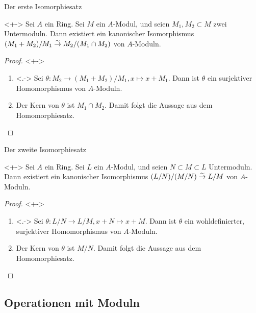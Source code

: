 \begin{frame}{Der erste Isomorphiesatz}
	\begin{proposition}<+->
		Sei \(A\) ein Ring. Sei \(M\) ein \(A\)-Modul, und seien \(M_1, M_2 \subset M\)
		zwei Untermoduln. Dann existiert ein kanonischer Isomorphismus
		\((M_1 + M_2)/M_1 \stackrel\sim\to M_2/(M_1 \cap M_2)\) von \(A\)-Moduln.
	\end{proposition}
	\begin{proof}<+->
		\begin{enumerate}[<+->]
		\item<.->
			Sei \(\theta\colon M_2 \to (M_1 + M_2)/M_1, x \mapsto x + M_1\). Dann ist \(\theta\)
			ein surjektiver Homomorphismus von \(A\)-Moduln.
		\item
			Der Kern von \(\theta\) ist \(M_1 \cap M_2\). Damit folgt die Aussage aus dem Homomorphiesatz.
			\qedhere
		\end{enumerate}
	\end{proof}
\end{frame}

\begin{frame}{Der zweite Isomorphiesatz}
	\begin{proposition}<+->
		Sei \(A\) ein Ring. Sei \(L\) ein \(A\)-Modul, und seien \(N \subset M \subset L\)
		Untermoduln. Dann existiert ein kanonischer Isomorphismus
		\((L/N)/(M/N) \stackrel\sim\to L/M\) von \(A\)-Moduln.
	\end{proposition}
	\begin{proof}<+->
		\begin{enumerate}[<+->]
		\item<.->
			Sei \(\theta\colon L/N \to L/M, x + N \mapsto x + M\). Dann ist \(\theta\) ein wohldefinierter,
			surjektiver Homomorphismus von \(A\)-Moduln.
		\item
			Der Kern von \(\theta\) ist \(M/N\). Damit folgt die Aussage aus dem Homomorphiesatz.
			\qedhere
		\end{enumerate}
	\end{proof}
\end{frame}

\subsection{Operationen mit Moduln}

